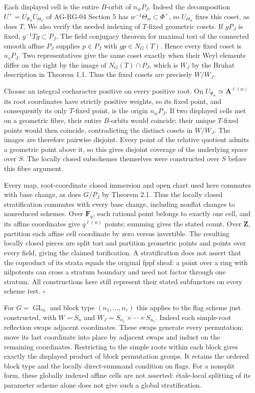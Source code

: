 \documentclass[11pt,a4paper,openany]{report}
\begin{document}
Each displayed cell is the entire \(B\)-orbit of \(n_wP_J\). Indeed the decomposition \(U^+=U_{\Psi_w}U_{\Theta_w}\) of AG-RG-04 Section 5 has \(w^{-1}\Theta_w\subset\Phi^+\), so \(U_{\Theta_w}\) fixes this coset, as does \(T\). We also verify the needed indexing of \(T\)-fixed geometric cosets. If \(gP_J\) is fixed, \(g^{-1}Tg\subset P_J\). The field conjugacy theorem for maximal tori of the connected smooth affine \(P_J\) supplies \(p\in P_J\) with \(gp\in N_G(T)\). Hence every fixed coset is \(n_vP_J\). Two representatives give the same coset exactly when their Weyl elements differ on the right by the image of \(N_G(T)\cap P_J\), which is \(W_J\) by the Bruhat description in Theorem 1.1. Thus the fixed cosets are precisely \(W/W_J\).

Choose an integral cocharacter positive on every positive root. On \(U_{\Psi_w}\simeq\mathbf A^{\ell(w)}\) its root coordinates have strictly positive weights, so its fixed point, and consequently its only \(T\)-fixed point, is the origin \(n_wP_J\). If two displayed cells met on a geometric fibre, their entire \(B\)-orbits would coincide; their unique \(T\)-fixed points would then coincide, contradicting the distinct cosets in \(W/W_J\). The images are therefore pairwise disjoint. Every point of the relative quotient admits a geometric point above it, so this gives disjoint coverage of the underlying space over \(S\). The locally closed subschemes themselves were constructed over \(S\) before this fibre argument.

Every map, root-coordinate closed immersion and open chart used here commutes with base change, as does \(G/P_J\) by Theorem 2.1. Thus the locally closed stratification commutes with every base change, including nonflat changes to nonreduced schemes. Over \(\mathbf F_q\), each rational point belongs to exactly one cell, and its affine coordinates give \(q^{\ell(w)}\) points; summing gives the stated count. Over \(\mathbf Z\), partition each affine cell coordinate by zero versus invertible. The resulting locally closed pieces are split tori and partition geometric points and points over every field, giving the claimed torification. A stratification does not assert that the coproduct of its strata equals the original fppf sheaf: a point over a ring with nilpotents can cross a stratum boundary and need not factor through one stratum. All constructions here still represent their stated subfunctors on every scheme test. \(\square\)

For \(G=\operatorname{GL}_n\) and block type \((n_1,\ldots,n_r)\) this applies to the flag scheme just constructed, with \(W=S_n\) and \(W_J=S_{n_1}\times\cdots\times S_{n_r}\). Indeed each simple-root reflection swaps adjacent coordinates. These swaps generate every permutation: move its last coordinate into place by adjacent swaps and induct on the remaining coordinates. Restricting to the simple roots within each block gives exactly the displayed product of block permutation groups. It retains the ordered block type and the locally direct-summand condition on flags. For a nonsplit form, these globally indexed affine cells are not asserted: étale-local splitting of its parameter scheme alone does not give such a global stratification.
\end{document}
